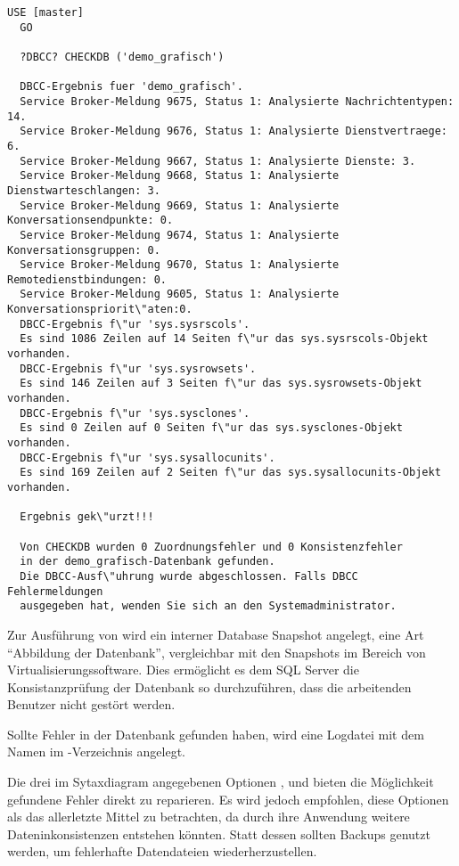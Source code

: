           \begin{lstlisting}[language=ms_sql,caption={Konsistenzprüfung einer
          Datenbank mit DBCC},label=admin03_30]
  USE [master]
  GO
  
  ?DBCC? CHECKDB ('demo_grafisch')
  
  DBCC-Ergebnis fuer 'demo_grafisch'.
  Service Broker-Meldung 9675, Status 1: Analysierte Nachrichtentypen: 14.
  Service Broker-Meldung 9676, Status 1: Analysierte Dienstvertraege: 6.
  Service Broker-Meldung 9667, Status 1: Analysierte Dienste: 3.
  Service Broker-Meldung 9668, Status 1: Analysierte Dienstwarteschlangen: 3.
  Service Broker-Meldung 9669, Status 1: Analysierte Konversationsendpunkte: 0.
  Service Broker-Meldung 9674, Status 1: Analysierte Konversationsgruppen: 0.
  Service Broker-Meldung 9670, Status 1: Analysierte Remotedienstbindungen: 0.
  Service Broker-Meldung 9605, Status 1: Analysierte Konversationspriorit\"aten:0.
  DBCC-Ergebnis f\"ur 'sys.sysrscols'.
  Es sind 1086 Zeilen auf 14 Seiten f\"ur das sys.sysrscols-Objekt vorhanden.
  DBCC-Ergebnis f\"ur 'sys.sysrowsets'.
  Es sind 146 Zeilen auf 3 Seiten f\"ur das sys.sysrowsets-Objekt vorhanden.
  DBCC-Ergebnis f\"ur 'sys.sysclones'.
  Es sind 0 Zeilen auf 0 Seiten f\"ur das sys.sysclones-Objekt vorhanden.
  DBCC-Ergebnis f\"ur 'sys.sysallocunits'.
  Es sind 169 Zeilen auf 2 Seiten f\"ur das sys.sysallocunits-Objekt vorhanden.
  
  Ergebnis gek\"urzt!!!
  
  Von CHECKDB wurden 0 Zuordnungsfehler und 0 Konsistenzfehler 
  in der demo_grafisch-Datenbank gefunden.
  Die DBCC-Ausf\"uhrung wurde abgeschlossen. Falls DBCC Fehlermeldungen
  ausgegeben hat, wenden Sie sich an den Systemadministrator.
          \end{lstlisting}
          Zur Ausführung von  wird ein interner Database
          Snapshot angelegt, eine Art \enquote{Abbildung der Datenbank},
          vergleichbar mit den Snapshots im Bereich von Virtualisierungssoftware.
          Dies ermöglicht es dem SQL Server die Konsistanzprüfung der Datenbank so
          durchzuführen, dass die arbeitenden Benutzer nicht gestört werden.
          
          Sollte  Fehler in der Datenbank gefunden haben,
          wird eine Logdatei mit dem Namen  im
          -Verzeichnis angelegt.
        
          Die drei im Sytaxdiagram angegebenen Optionen
          ,  und
           bieten die Möglichkeit gefundene Fehler
          direkt zu reparieren. Es wird jedoch empfohlen, diese Optionen als das
          allerletzte Mittel zu betrachten, da durch ihre Anwendung weitere
          Dateninkonsistenzen entstehen könnten. Statt dessen sollten Backups
          genutzt werden, um fehlerhafte Datendateien wiederherzustellen.
